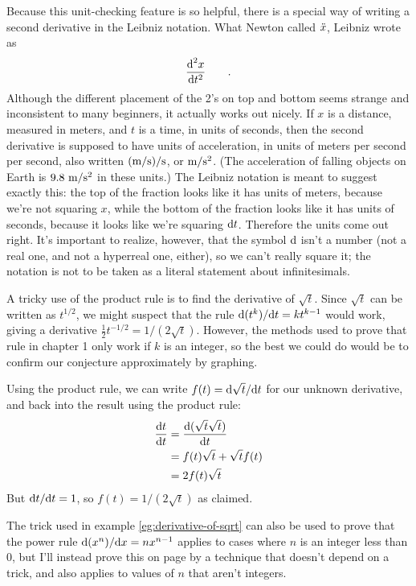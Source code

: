Because this unit-checking feature is so helpful, there is a special way of writing a second
derivative in the Leibniz notation. What Newton called $\Ddot{x}$, Leibniz wrote as
\begin{equation*}
  \frac{\textup{d}^2 x}{\textup{d} t^2} \qquad .
\end{equation*}
Although the different placement of the 2's on top and bottom seems strange and inconsistent to many
beginners, it actually works out nicely.
If $x$ is a distance, measured in meters, and $t$ is a time, in units of seconds, then the
second derivative is supposed to have units of acceleration, in units of meters per second per
second, also written $(\textup{m}/\textup{s})/\textup{s}$, or $\textup{m}/\textup{s}^2$. (The acceleration of falling
objects on Earth is $9.8\ \munit/\sunit^2$ in these units.) The Leibniz notation is meant to suggest
exactly this: the top of the fraction looks like it has units of meters, because we're not squaring $x$,
while the bottom of the fraction looks like it has units of seconds, because it looks like we're
squaring $\textup{d} t$. Therefore the units come out right. It's important to realize, however, that
the symbol $\textup{d}$ isn't a number (not a real one, and not a hyperreal one, either), so we can't really
square it; the notation is not to be taken as a literal statement about infinitesimals.

\begin{eg}\label{eg:derivative-of-sqrt}
A tricky use of the product rule is to find the derivative of $\sqrt{t}$. Since $\sqrt{t}$ can be
written as $t^{1/2}$, we might suspect that the rule $\textup{d}(t^k)/\textup{d} t=kt^{k-1}$ would work,
giving a derivative $\frac{1}{2}t^{-1/2}=1/(2\sqrt{t})$. However, the methods used to prove
that rule in chapter 1 only work if $k$ is an integer, so the best we could do would be to confirm
our conjecture approximately by graphing.

Using the product rule, we can write $f(t)=\textup{d}\sqrt{t}/\textup{d} t$ for our unknown derivative, and
back into the result using the product rule:
\begin{align*}
  \frac{\textup{d} t}{\textup{d} t} &= \frac{\textup{d}(\sqrt{t}\sqrt{t})}{\textup{d} t} \\
           &= f(t)\sqrt{t}+\sqrt{t}f(t) \\
           &= 2f(t)\sqrt{t}
\end{align*}
But $\textup{d} t/\textup{d} t=1$, so $f(t)=1/(2\sqrt{t})$ as claimed.
\end{eg}

The trick used in example \ref{eg:derivative-of-sqrt} can also be used to prove that the power
rule $\textup{d}(x^n)/\textup{d} x=nx^{n-1}$ applies to cases where $n$ is an integer less than 0, but
I'll instead prove this on page \pageref{eg:der-x-to-any-k} by a technique that doesn't depend on
a trick, and also applies to values of $n$ that aren't integers.\label{coy-der-x-to-neg-k}

